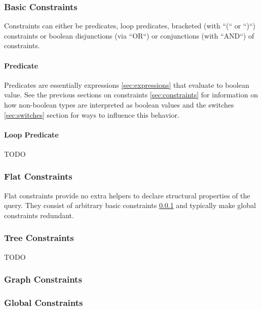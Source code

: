 \documentclass[11pt]{article}
\begin{document}
\subsubsection{Basic Constraints}
\label{sec:basic-constraints}

Constraints can either be predicates, loop predicates, bracketed (with ``(`` or ``)``) constraints or boolean disjunctions (via ``OR``) or conjunctions (with ``AND``) of constraints.

\paragraph{Predicate}
\label{sec:predicate}

Predicates are essentially expressions \cref{sec:expressions} that evaluate to boolean value. See the previous sections on constraints \cref{sec:constraints} for information on how non-boolean types are interpreted as boolean values and the switches \cref{sec:switches} section for ways to influence this behavior.

\paragraph{Loop Predicate}

TODO

\subsubsection{Flat Constraints}
\label{sec:flat-constraints}

Flat constraints provide no extra helpers to declare structural properties of the query. They consist of arbitrary basic constraints \cref{sec:basic-constraints} and typically make global constraints redundant.

\subsubsection{Tree Constraints}
\label{sec:tree-constraints}

TODO

\subsubsection{Graph Constraints}
\label{sec:graph-constraints}


\subsubsection{Global Constraints}
\label{sec:global-constraints}
\end{document}
